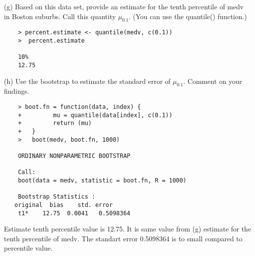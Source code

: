 \documentclass{article}
\begin{document}
(g) Based on this data set, provide an estimate for the tenth percentile of medv in Boston suburbs. Call this quantity $\mu_{0.1}$. (You can use the quantile() function.)

\begin{program}
	\begin{verbatim}
	> percent.estimate <- quantile(medv, c(0.1))
	>  percent.estimate
	
	10% 
	12.75 
	\end{verbatim}
\end{program}


(h) Use the bootstrap to estimate the standard error of $\mu_{0.1}$. Comment on your findings.



\begin{program}
	\begin{verbatim}
	> boot.fn = function(data, index) { 
	+ 	      mu = quantile(data[index], c(0.1)) 
	+ 	      return (mu)
	+   }
	>   boot(medv, boot.fn, 1000)
	
	ORDINARY NONPARAMETRIC BOOTSTRAP

	Call:
	boot(data = medv, statistic = boot.fn, R = 1000)
		
	Bootstrap Statistics :
   original  bias    std. error
	t1*    12.75  0.0041   0.5098364
	\end{verbatim}
\end{program}


Estimate tenth percentile value is 12.75. It is same value from (g) estimate for the tenth percentile of medv. The standart error 0.5098364 is to small compared to percentile value.
\end{document}

